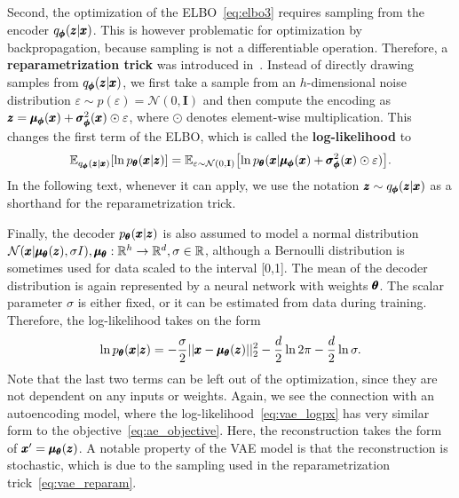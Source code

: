 Second, the optimization of the ELBO~\eqref{eq:elbo3} requires sampling from the encoder $q_{\pmb{{\phi}}}(\pmb{{z}}|\pmb{{x}})$. This is however problematic for optimization by backpropagation, because sampling is not a differentiable operation. Therefore, a \textbf{reparametrization trick} was introduced in~\cite{kingma2013vae}. Instead of directly drawing samples from $q_{\pmb{{\phi}}}(\pmb{{z}}|\pmb{{x}})$, we first take a sample from an $h$-dimensional noise distribution $\varepsilon\sim p(\varepsilon)=\mathcal{N}(0,\mathbf{I})$ and then compute the encoding as $\pmb{{z}}=\pmb{{\mu}}_{\pmb{{\phi}}}(\pmb{{x}})+\pmb{{\sigma}}^2_{\pmb{{\phi}}}(\pmb{{x}}) \odot \varepsilon$, where $\odot$ denotes element-wise multiplication. This changes the first term of the ELBO, which is called the \textbf{log-likelihood} to
\begin{equation} \label{eq:vae_reparam}
\mathbb{E}_{q_{\vc{\phi}}(\vc{z}|\vc{x})}\left[\ln p_{\vc{\theta}}(\vc{x}|\vc{z})\right] = \mathbb{E}_{\varepsilon\sim\mathcal{N}(0,\textbf{I})}\left[\ln p_{\vc{\theta}}(\vc{x}| \vc{\mu}_{\vc{\phi}}(\vc{x})+\vc{\sigma}^2_{\vc{\phi}}(\vc{x}) \odot \varepsilon )\right].
\end{equation}
In the following text, whenever it can apply, we use the notation $\pmb{{z}} \sim q_{\pmb{{\phi}}}(\pmb{{z}}|\pmb{{x}})$ as a shorthand for the reparametrization trick.

Finally, the decoder $p_{\pmb{{\theta}}}(\pmb{{x}}|\pmb{{z}})$ is also assumed to model a normal distribution\\ $\mathcal{N}(\pmb{{x}}|\pmb{{\mu}}_{\pmb{{\theta}}}(\pmb{{z}}),\sigma I), \pmb{{\mu}}_{\pmb{{\theta}}} :\mathbb{R}^h \rightarrow \mathbb{R}^d, \sigma\in\mathbb{R}$, although a Bernoulli distribution is sometimes used for data scaled to the interval [0,1]. The mean of the decoder distribution is again represented by a neural network with weights $\pmb{{\theta}}$. The scalar parameter $\sigma$ is either fixed, or it can be estimated from data during training. Therefore, the log-likelihood takes on the form 
\begin{equation} \label{eq:vae_logpx}
\ln p_{\pmb{{\theta}}}(\pmb{{x}}|\pmb{{z}}) = - \frac{\sigma}{2} \vert \vert \pmb{{x}} - \pmb{{\mu}}_{\pmb{{\theta}}}(\pmb{{z}}) \vert \vert_2^2 - \frac{d}{2} \ln 2\pi - \frac{d}{2} \ln \sigma. 
\end{equation}
Note that the last two terms can be left out of the optimization, since they are not dependent on any inputs or weights. Again, we see the connection with an autoencoding model, where the log-likelihood~\eqref{eq:vae_logpx} has very similar form to the objective~\eqref{eq:ae_objective}. Here, the reconstruction takes the form of $\pmb{{x}}' = \pmb{{\mu}}_{\pmb{{\theta}}}(\pmb{{z}})$. A notable property of the VAE model is that the reconstruction is stochastic, which is due to the sampling used in the reparametrization trick~\eqref{eq:vae_reparam}. 

